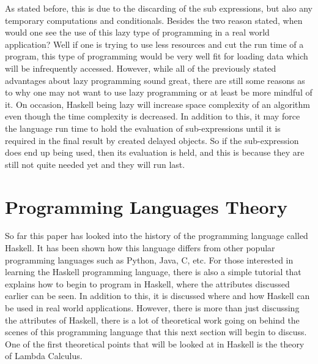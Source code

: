 \documentclass{article}
\begin{document}
As stated before, this is due to the discarding of the sub expressions, but also any temporary computations and conditionals.
Besides the two reason stated, when would one see the use of this lazy type of programming in a real world application?
Well if one is trying to use less resources and cut the run time of a program, this type of programming would be very well fit for loading data which will be infrequently accessed.
However, while all of the previously stated advantages about lazy programming sound great, there are still some reasons as to why one may not want to use lazy programming or at least be more mindful of it.
On occasion, Haskell being lazy will increase space complexity of an algorithm even though the time complexity is decreased.
In addition to this, it may force the language run time to hold the evaluation of sub-expressions until it is required in the final result by created delayed objects.
So if the sub-expression does end up being used, then its evaluation is held, and this is because they are still not quite needed yet and they will run last.




\section{Programming Languages Theory}
\medskip\noindent %
So far this paper has looked into the history of the programming language called Haskell.
It has been shown how this language differs from  other popular programming languages such as Python, Java, C, etc.
For those interested in learning the Haskell programming language, there is also a simple tutorial that explains how to begin to program in Haskell, where the attributes discussed earlier can be seen.
In addition to this, it is discussed where and how Haskell can be used in real world applications.
However, there is  more than just discussing the attributes of Haskell, there is a lot of theoretical work going on behind the scenes of this programming language that this next section will begin to discuss.
One of the first theoretical points that will be looked at in Haskell is the theory of Lambda Calculus.
\end{document}
